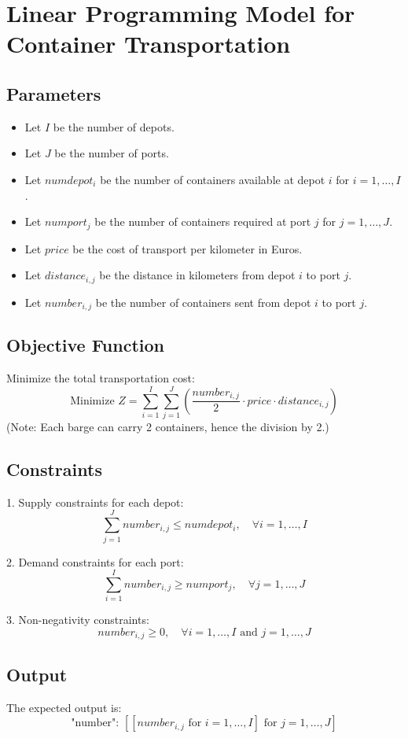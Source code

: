 \documentclass{article}
\begin{document}
\section*{Linear Programming Model for Container Transportation}

\subsection*{Parameters}
\begin{itemize}
    \item Let $I$ be the number of depots.
    \item Let $J$ be the number of ports.
    \item Let $numdepot_i$ be the number of containers available at depot $i$ for $i = 1, \ldots, I$.
    \item Let $numport_j$ be the number of containers required at port $j$ for $j = 1, \ldots, J$.
    \item Let $price$ be the cost of transport per kilometer in Euros.
    \item Let $distance_{i,j}$ be the distance in kilometers from depot $i$ to port $j$.
    \item Let $number_{i,j}$ be the number of containers sent from depot $i$ to port $j$.
\end{itemize}

\subsection*{Objective Function}
Minimize the total transportation cost:
\[
\text{Minimize } Z = \sum_{i=1}^{I} \sum_{j=1}^{J} \left( \frac{number_{i,j}}{2} \cdot price \cdot distance_{i,j} \right)
\]
(Note: Each barge can carry 2 containers, hence the division by 2.)

\subsection*{Constraints}
1. Supply constraints for each depot:
   \[
   \sum_{j=1}^{J} number_{i,j} \leq numdepot_i, \quad \forall i = 1, \ldots, I
   \]

2. Demand constraints for each port:
   \[
   \sum_{i=1}^{I} number_{i,j} \geq numport_j, \quad \forall j = 1, \ldots, J
   \]

3. Non-negativity constraints:
   \[
   number_{i,j} \geq 0, \quad \forall i = 1, \ldots, I \text{ and } j = 1, \ldots, J
   \]

\subsection*{Output}
The expected output is:
\[
\text{"number": } [[number_{i,j} \text{ for } i=1,\ldots,I] \text{ for } j=1,\ldots,J]
\]
\end{document}
